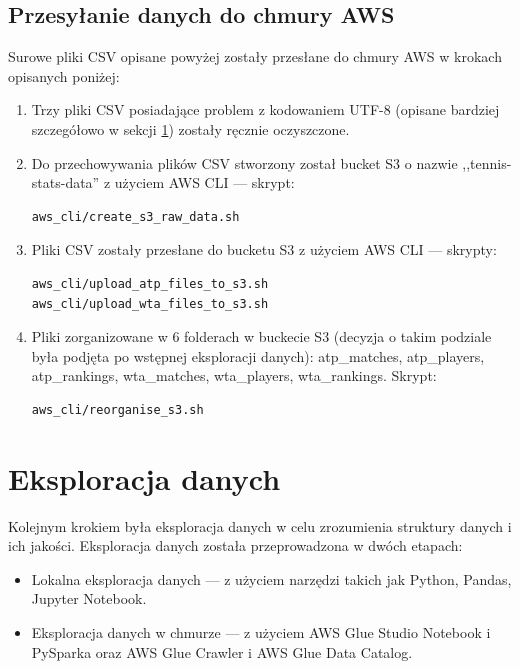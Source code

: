 \documentclass[12pt, a4paper]{article}
\begin{document}
\subsection{Przesyłanie danych do chmury AWS}
Surowe pliki CSV opisane powyżej zostały przesłane do chmury AWS w krokach opisanych poniżej:
\begin{enumerate}
    \item Trzy pliki CSV posiadające problem z kodowaniem UTF-8 (opisane bardziej szczegółowo w sekcji \ref{sec:explore}) zostały ręcznie oczyszczone.
    \item Do przechowywania plików CSV stworzony został bucket S3 o nazwie ,,tennis-stats-data'' z użyciem AWS CLI --- skrypt:
\begin{verbatim}
aws_cli/create_s3_raw_data.sh
\end{verbatim}
    \item Pliki CSV zostały przesłane do bucketu S3 z użyciem AWS CLI --- skrypty:
\begin{verbatim}
aws_cli/upload_atp_files_to_s3.sh
aws_cli/upload_wta_files_to_s3.sh
\end{verbatim}
    \item Pliki zorganizowane w 6 folderach w buckecie S3 (decyzja o takim podziale była podjęta po wstępnej eksploracji danych): atp\_matches, atp\_players, atp\_rankings, wta\_matches, wta\_players, wta\_rankings. Skrypt:
\begin{verbatim}
aws_cli/reorganise_s3.sh
\end{verbatim}
\end{enumerate}


\section{Eksploracja danych} \label{sec:explore}
Kolejnym krokiem była eksploracja danych w celu zrozumienia struktury danych i ich jakości. Eksploracja danych została przeprowadzona w dwóch etapach:
\begin{itemize}
    \item Lokalna eksploracja danych --- z użyciem narzędzi takich jak Python, Pandas, Jupyter Notebook.
    \item Eksploracja danych w chmurze --- z użyciem AWS Glue Studio Notebook i PySparka oraz AWS Glue Crawler i AWS Glue Data Catalog.
\end{itemize}
\end{document}
